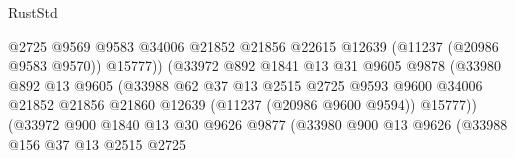 \begin{lexlean}{RustStd}
\begin{coremodule}
                                          @2725
                                          @9569
                                          @9583
                                          @34006
                                          @21852
                                          @21856
                                          @22615
                                          @12639
                                          (@11237 (@20986 @9583 @9570))
                                          @15777))
                                      (@33972
                                        @892
                                        @1841
                                        @13
                                        @31
                                        @9605
                                        @9878
                                        (@33980
                                          @892
                                          @13
                                          @9605
                                          (@33988
                                            @62
                                            @37
                                            @13
                                            @2515
                                            @2725
                                            @9593
                                            @9600
                                            @34006
                                            @21852
                                            @21856
                                            @21860
                                            @12639
                                            (@11237 (@20986 @9600 @9594))
                                            @15777))
                                        (@33972
                                          @900
                                          @1840
                                          @13
                                          @30
                                          @9626
                                          @9877
                                          (@33980
                                            @900
                                            @13
                                            @9626
                                            (@33988
                                              @156
                                              @37
                                              @13
                                              @2515
                                              @2725

\end{coremodule}
\end{lexlean}
